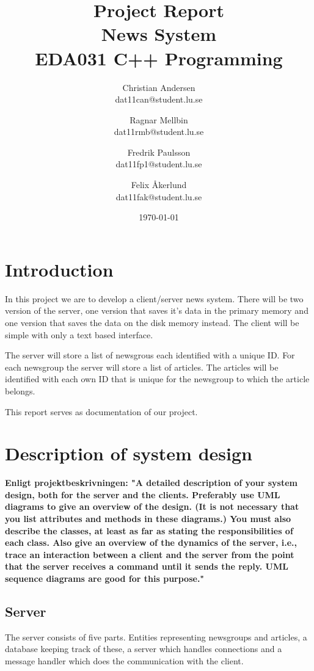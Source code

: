 \documentclass[a4paper]{article}
\title{Project Report \\ News System  \\ EDA031 C++ Programming}
\date{\today}
\author{Christian Andersen \\ dat11can@student.lu.se \and Ragnar Mellbin \\ dat11rmb@student.lu.se \and Fredrik Paulsson \\ dat11fp1@student.lu.se
\and Felix Åkerlund \\ dat11fak@student.lu.se}
\begin{document}
\maketitle


\section{Introduction}
In this project we are to develop a client/server news system. There will be two version of the server, one version that saves it's data in the primary memory and one version that saves the data on the disk memory instead. The client will be simple with only a text based interface.

The server will store a list of newsgrous each identified with a unique ID. For each newsgroup the server will store a list of articles. The articles will be identified with each own ID that is unique for the newsgroup to which the article belongs.

This report serves as documentation of our project.

\section{Description of system design}

\textbf{Enligt projektbeskrivningen: "A detailed description of your system design, both for the server and the clients. Preferably
use UML diagrams to give an overview of the design. (It is not necessary that you list
attributes and methods in these diagrams.) You must also describe the classes, at least as
far as stating the responsibilities of each class. Also give an overview of the dynamics of the server, i.e., trace an interaction between a
client and the server from the point that the server receives a command until it sends the
reply. UML sequence diagrams are good for this purpose."}

\subsection{Server}

The server consists of five parts. Entities representing newsgroups and articles, a database keeping track of these, a server which handles connections and a message handler which does the communication with the client.
\end{document}
